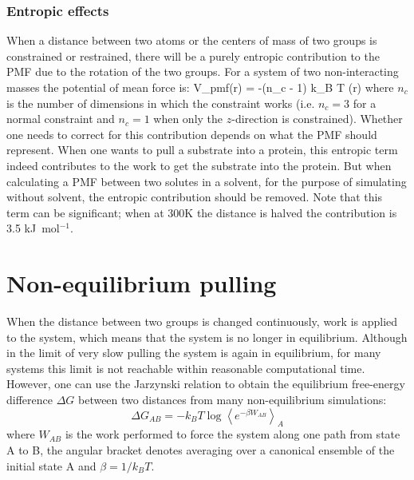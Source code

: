 \subsubsection{Entropic effects}
When a distance between two atoms or the centers of mass of two groups
is constrained or restrained, there will be a purely entropic contribution
to the PMF due to the rotation of the two groups.
For a system of two non-interacting masses the potential of mean force is:
\beq
V_{pmf}(r) = -(n_c - 1) k_B T \log(r)
\eeq
where $n_c$ is the number of dimensions in which the constraint works
(i.e. $n_c=3$ for a normal constraint and $n_c=1$ when only
the $z$-direction is constrained).
Whether one needs to correct for this contribution depends on what
the PMF should represent. When one wants to pull a substrate
into a protein, this entropic term indeed contributes to the work to
get the substrate into the protein. But when calculating a PMF
between two solutes in a solvent, for the purpose of simulating
without solvent, the entropic contribution should be removed.
Note that this term can be significant; when at 300K the distance is halved
the contribution is 3.5 kJ~mol$^{-1}$.

\section{Non-equilibrium pulling}
When the distance between two groups is changed continuously,
work is applied to the system, which means that the system is no longer
in equilibrium. Although in the limit of very slow pulling
the system is again in equilibrium, for many systems this limit
is not reachable within reasonable computational time.
However, one can use the Jarzynski relation\cite{Jarzynski1997a}
to obtain the equilibrium free-energy difference $\Delta G$
between two distances from many non-equilibrium simulations:
\begin{equation}
   \Delta G_{AB} = -k_BT \log \left\langle e^{-\beta W_{AB}} \right\rangle_A
   \label{eq:Jarz}
\end{equation}
where $W_{AB}$ is the work performed to force the system along one path
from state A to B, the angular bracket denotes averaging over
a canonical ensemble of the initial state A and $\beta=1/k_B T$.


